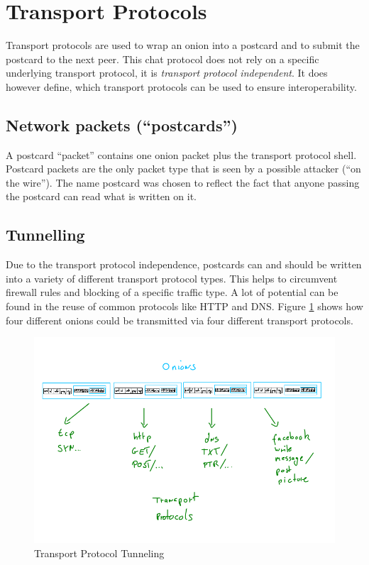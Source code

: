 \section{Transport Protocols}
Transport protocols are used to wrap an onion into a postcard
and to submit the postcard to the next peer.
This chat protocol does not rely on a specific underlying transport protocol,
it is \textit{transport protocol independent}. It does however define, which
transport protocols can be used to ensure interoperability.
\subsection{Network packets ("`postcards"')}
\label{eofpostcard}
A postcard "`packet"' contains one onion packet plus the transport protocol
shell. Postcard packets are the only packet type that is seen by a possible
attacker ("`on the wire"'). 
The name postcard was chosen to reflect the fact that anyone
passing the postcard can read what is written on it.
\subsection{Tunnelling}
\label{tunneling}
Due to the transport protocol independence, postcards can and should
be written into a variety of different transport protocol types.
This helps to circumvent firewall rules and blocking of a specific
traffic type. A lot of potential can be found in the reuse of
common protocols like HTTP and DNS.\cite{rfc1034, rfc1035, rfc2616}
Figure \ref{tptunneling} shows how four different onions could be
transmitted via four different transport protocols.
\begin{figure}
    \centering
    \caption{Transport Protocol Tunneling}
    \label{tptunneling}
    \includegraphics[scale=0.8]{tp-tunneling.png}
\end{figure}

